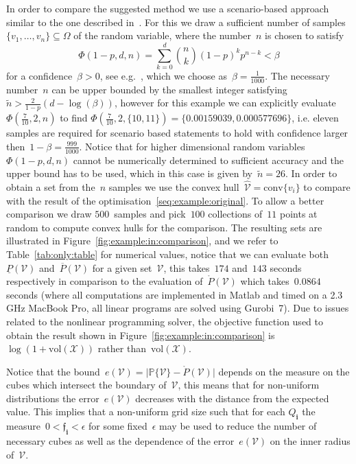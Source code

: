 \documentclass[letterpaper, 10pt, conference]{ieeeconf} %
\providecommand{\conv}{\text{conv}}
\providecommand{\bfa}[1]{\mathbf{#1}}
\begin{document}
%
In order to compare the suggested method we use a scenario-based approach similar to the one described in~\cite{Margellos:2014}.
%
For this we draw a sufficient number of samples~$\{v_1,\dots,v_n\}\subseteq\Omega$ of the random variable, where the number~$n$ is chosen to satisfy
\[
\Phi(1-p,d,n) = \sum_{k=0}^{d}\binom{n}{k}(1-p)^kp^{n-k}<\beta
\]
for a confidence~$\beta>0$, see e.g.~\cite{Calafiore:2010}, which we choose as~$\beta=\frac{1}{1000}$.
%
The necessary number~$n$ can be upper bounded by the smallest integer satisfying~$\tilde n>\frac{2}{1-p}(d-\log(\beta))$, however for this example we can explicitly evaluate~$\Phi(\frac{7}{10},2,n)$ to find $\Phi(\frac{7}{10},2,\{10,11\}) = \{0.00159039,0.000577696\}$, i.e. eleven samples are required for scenario based statements to hold with confidence larger then~$1-\beta=\frac{999}{1000}$.
%
Notice that for higher dimensional random variables~$\Phi(1-p,d,n)$ cannot be numerically determined to sufficient accuracy and the upper bound has to be used, which in this case is given by~$\tilde n=26$.
%
In order to obtain a set from the~$n$ samples we use the convex hull~$\hat{\mathcal V}=\conv\{v_i\}$ to compare with the result of the optimisation~\eqref{seq:example:original}.
%
To allow a better comparison we draw $500$~samples and pick~$100$ collections of~$11$ points at random to compute convex hulls for the comparison.
%
The resulting sets are illustrated in Figure~\ref{fig:example:in:comparison}, and we refer to Table~\ref{tab:only:table} for numerical values, notice that we can evaluate both~$\underline{P}(\mathcal V)$ and~$\overline{P}(\mathcal V)$ for a given set~$\mathcal V$, this takes~$174$ and~$143$ seconds respectively in comparison to the evaluation of~$\mathring{P}(\mathcal V)$ which takes~$0.0864$ seconds (where all computations are implemented in Matlab and timed on a 2.3 GHz MacBook Pro, all linear programs are solved using Gurobi~7).
%
Due to issues related to the nonlinear programming solver, the objective function used to obtain the result shown in Figure~\ref{fig:example:in:comparison} is~$\log(1+\text{vol}(\mathcal X))$ rather than~$\text{vol}(\mathcal X)$.
%


%
Notice that the bound~$e(\mathcal V) = \lvert\mathbb P\{\mathcal V\}-\mathring{P}(\mathcal V)\rvert$ depends on the measure on the cubes which intersect the boundary of~$\mathcal V$, this means that for non-uniform distributions the error~$e(\mathcal V)$ decreases with the distance from the expected value.
%
This implies that a non-uniform grid size such that for each $Q_\bfa{i}$ the measure~$0<\mathfrak{f}_\bfa{i}<\epsilon$ for some fixed~$\epsilon$ may be used to reduce the number of necessary cubes as well as the dependence of the error~$e(\mathcal V)$ on the inner radius of~$\mathcal V$.
\end{document}
